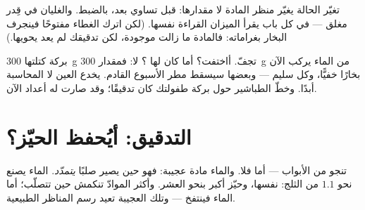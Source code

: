 \begin{proposition}\label{prop:g6:water-states:mass}
تغيّر الحالة يغيّر منظر المادة لا مقدارها:  قبل تساوي
 بعد، بالضبط.   والغليان في قِدر مغلق
 --- في كل باب يقرأ الميزان القراءة نفسها. (لكن اترك
الغطاء مفتوحًا فينجرف البخار بغراماته: فالمادة ما زالت موجودة،
لكن تدقيقك لم يعد يحويها.)
\end{proposition}

\begin{example}\label{ex:g6:water-states:puddle}
بركة كتلتها \qty{300}{g} تجفّ. أاختفت؟ أما كان لها ؟ لا:
فمقدار \qty{300}{g} من الماء يركب الآن  بخارًا خفيًّا، وكل 
سليم --- وبعضها سيسقط مطر الأسبوع القادم.  يخدع العين
لا المحاسبة أبدًا. وخطّ الطباشير حول بركة طفولتك كان تدقيقًا؛
وقد صارت له أعداد الآن.
\end{example}

\section{التدقيق: أيُحفظ الحيّز؟}

\begin{proposition}\label{prop:g6:water-states:volume}
 تنجو من الأبواب --- أما  فلا. والماء مادة عجيبة:
فهو حين يصير صلبًا \emph{يتمدّد}.  الماء يصنع نحو $1.1$ 
من الثلج:  نفسها، وحيّز أكبر بنحو العشر. وأكثر الموادّ
تنكمش حين تتصلّب؛ أما الماء فينتفخ --- وتلك العجيبة تعيد رسم
المناظر الطبيعية.
\end{proposition}

